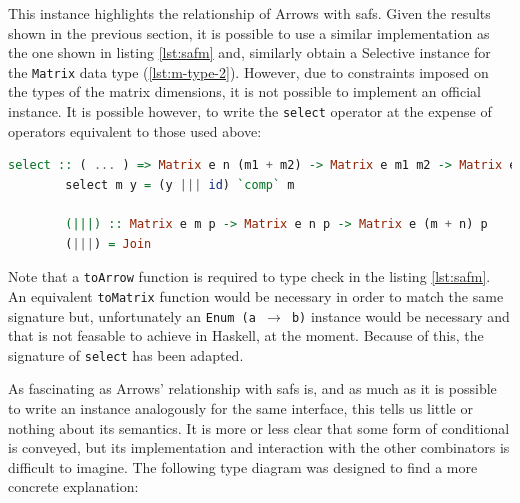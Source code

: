 \documentclass[
  oneside,
  11pt, a4paper,
  footinclude=true,
  headinclude=true,
  cleardoublepage=empty
]{scrbook}
\theoremstyle{definition}
\theoremstyle{definition}
\begin{document}
	    This instance highlights the relationship of Arrows with \glspl{saf}. Given the results shown in the previous section, it is possible to use a similar implementation as the one shown in listing \ref{lst:safm} and, similarly obtain a Selective instance for the \texttt{Matrix} data type (\ref{lst:m-type-2}). However, due to constraints imposed on the types of the matrix dimensions, it is not possible to implement an official instance. It is possible however, to write the \texttt{select} operator at the expense of operators equivalent to those used above:
	    
        \begin{lstlisting}[language=Haskell, label={lst:safm2}, caption={LAoP Selective instance},captionpos=b]
        select :: ( ... ) => Matrix e n (m1 + m2) -> Matrix e m1 m2 -> Matrix e n m2
        select m y = (y ||| id) `comp` m
            
        (|||) :: Matrix e m p -> Matrix e n p -> Matrix e (m + n) p
        (|||) = Join
        \end{lstlisting}{}
        
        Note that a \texttt{toArrow} function is required to type check in the listing \ref{lst:safm}. An equivalent \texttt{toMatrix} function would be necessary in order to match the same signature but, unfortunately an \texttt{Enum (a $\rightarrow$ b)} instance would be necessary and that is not feasable to achieve in Haskell, at the moment. Because of this, the signature of \texttt{select} has been adapted.
        
        As fascinating as Arrows' relationship with \glspl{saf} is, and as much as it is possible to write an instance analogously for the same interface, this tells us little or nothing about its semantics. It is more or less clear that some form of conditional is conveyed, but its implementation and interaction with the other combinators is difficult to imagine. The following type diagram was designed to find a more concrete explanation:
        
        \vskip0.2cm
        
        \begin{center}
        \end{center}
        
\end{document}
